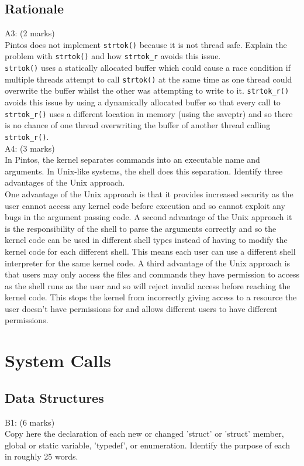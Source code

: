 \documentclass[11pt, a4paper]{article}
\begin{document}
\subsection{Rationale}
A3: (2 marks)\\
Pintos does not implement \verb|strtok()| because it is not thread safe. Explain the
problem with \verb|strtok()| and how \verb|strtok_r| avoids this issue.\bigskip\\
\verb|strtok()| uses a statically allocated buffer which could cause a race condition
if multiple threads attempt to call \verb|strtok()| at the same time as one thread could
overwrite the buffer whilst the other was attempting to write to it. \verb|strtok_r()|
avoids this issue by using a dynamically allocated buffer so that every call to \verb|strtok_r()|
uses a different location in memory (using the saveptr) and so there is no chance of one thread overwriting the buffer
of another thread calling \verb|strtok_r()|.\bigskip\\
A4: (3 marks)\\
In Pintos, the kernel separates commands into an executable name and arguments.
In Unix-like systems, the shell does this separation. Identify three advantages
of the Unix approach.\bigskip\\
One advantage of the Unix approach is that it provides increased security as
the user cannot access any kernel code before execution and so cannot exploit any bugs in the argument
passing code.
A second advantage of the Unix approach it is the responsibility of the shell to parse the arguments
correctly and so the kernel code can be used in different shell types instead of having to modify the
kernel code for each different shell. This means each user can use a different shell interpreter for the same kernel code.
A third advantage of the Unix approach is that users may only access the files and commands they have
permission to access as the shell runs as the user and so will reject invalid access before
reaching the kernel code. This stops the kernel from incorrectly giving access to a resource the user
doesn't have permissions for and allows different users to have different permissions.

\section{System Calls}
\subsection{Data Structures}
B1: (6 marks)\\
Copy here the declaration of each new or changed 'struct' or 'struct' member, 
global or static variable, 'typedef', or enumeration. Identify the purpose of each
in roughly 25 words.
\end{document}
